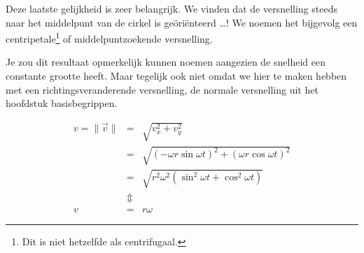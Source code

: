 \documentclass{ximera}
\begin{document}
Deze laatste gelijkheid is zeer belangrijk. We vinden dat de versnelling steeds naar het middelpunt van de cirkel is ge\"ori\"enteerd \ldots! We noemen het bijgevolg een centripetale\footnote{Dit is niet hetzelfde als centrifugaal.} of middelpuntzoekende versnelling.

\begin{image}
	
\end{image}

Je zou dit resultaat opmerkelijk kunnen noemen aangezien de snelheid een constante grootte heeft.
Maar tegelijk ook niet omdat we hier te maken hebben met een richtingsveranderende versnelling, de normale versnelling uit het hoofdstuk basisbegrippen.

\begin{eqnarray}
	v=\parallel\vec{v}\parallel&=&\sqrt{v_x^2+v_y^2}\nonumber\\
	&=&\sqrt{(-\omega r\sin\omega t)^2+(\omega r\cos\omega t)^2}\nonumber\\
	&=&\sqrt{r^2\omega^2(\sin^2\omega t+\cos^2\omega t)}\nonumber\\
	&\Updownarrow&\nonumber\\
	v&=&r\omega\label{snelheid}
\end{eqnarray}
\end{document}
